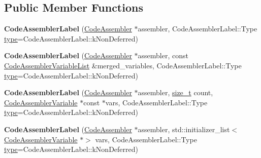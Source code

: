 \subsection*{Public Member Functions}
\begin{DoxyCompactItemize}
\item 
\mbox{\label{classv8_1_1internal_1_1compiler_1_1CodeAssemblerLabel_a590c35cb72b5707229f65a1d13fe9417}} 
{\bfseries Code\+Assembler\+Label} (\mbox{\hyperlink{classv8_1_1internal_1_1compiler_1_1CodeAssembler}{Code\+Assembler}} $\ast$assembler, Code\+Assembler\+Label\+::\+Type \mbox{\hyperlink{classstd_1_1conditional_1_1type}{type}}=Code\+Assembler\+Label\+::k\+Non\+Deferred)
\item 
\mbox{\label{classv8_1_1internal_1_1compiler_1_1CodeAssemblerLabel_aaab36ce4d36fa91f2dd1d3e754e552a6}} 
{\bfseries Code\+Assembler\+Label} (\mbox{\hyperlink{classv8_1_1internal_1_1compiler_1_1CodeAssembler}{Code\+Assembler}} $\ast$assembler, const \mbox{\hyperlink{classv8_1_1internal_1_1ZoneVector}{Code\+Assembler\+Variable\+List}} \&merged\+\_\+variables, Code\+Assembler\+Label\+::\+Type \mbox{\hyperlink{classstd_1_1conditional_1_1type}{type}}=Code\+Assembler\+Label\+::k\+Non\+Deferred)
\item 
\mbox{\label{classv8_1_1internal_1_1compiler_1_1CodeAssemblerLabel_a0f5d6b940f7a72191b4996fb334df9a5}} 
{\bfseries Code\+Assembler\+Label} (\mbox{\hyperlink{classv8_1_1internal_1_1compiler_1_1CodeAssembler}{Code\+Assembler}} $\ast$assembler, \mbox{\hyperlink{classsize__t}{size\+\_\+t}} count, \mbox{\hyperlink{classv8_1_1internal_1_1compiler_1_1CodeAssemblerVariable}{Code\+Assembler\+Variable}} $\ast$const $\ast$vars, Code\+Assembler\+Label\+::\+Type \mbox{\hyperlink{classstd_1_1conditional_1_1type}{type}}=Code\+Assembler\+Label\+::k\+Non\+Deferred)
\item 
\mbox{\label{classv8_1_1internal_1_1compiler_1_1CodeAssemblerLabel_af944ea5697cf2528902735bdaffdeebc}} 
{\bfseries Code\+Assembler\+Label} (\mbox{\hyperlink{classv8_1_1internal_1_1compiler_1_1CodeAssembler}{Code\+Assembler}} $\ast$assembler, std\+::initializer\+\_\+list$<$ \mbox{\hyperlink{classv8_1_1internal_1_1compiler_1_1CodeAssemblerVariable}{Code\+Assembler\+Variable}} $\ast$$>$ vars, Code\+Assembler\+Label\+::\+Type \mbox{\hyperlink{classstd_1_1conditional_1_1type}{type}}=Code\+Assembler\+Label\+::k\+Non\+Deferred)
$$
\end{DoxyCompactItemize}
